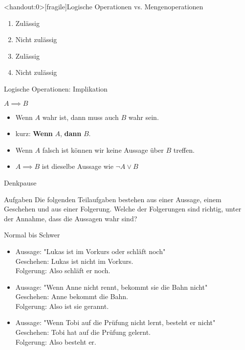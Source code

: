 {
	\begin{frame}<handout:0>[fragile]{Logische Operationen vs. Mengenoperationen}
		\begin{enumerate}[<+- | alert@+>]
			\item Zulässig
			\item Nicht zulässig
			\item Zulässig
			\item Nicht zulässig
		\end{enumerate}
	\end{frame}
}



\begin{frame}{Logische Operationen: Implikation}
\begin{alertblock}{$A\implies B$}
\begin{itemize}
    \item \glqq Wenn $A$ wahr ist, dann muss auch $B$ wahr sein.\grqq
    \item kurz: \glqq\textbf{Wenn} $A$, \textbf{dann} $B$.\grqq
    \item Wenn $A$ falsch ist können wir keine Aussage über $B$ treffen.
    \item $A\implies B$ ist dieselbe Aussage wie $\neg A \vee B$
\end{itemize}
\end{alertblock}
\end{frame}

{
	\begin{frame}{Denkpause}
		\begin{alertblock}{Aufgaben}
			Die folgenden Teilaufgaben bestehen aus einer Aussage, einem Geschehen und aus einer Folgerung. Welche der Folgerungen sind richtig, unter der Annahme, 
			dass die Aussagen wahr sind?
		\end{alertblock}
		\begin{block}{Normal bis Schwer}
			\begin{itemize}
				\item Aussage: "Lukas ist im Vorkurs oder schläft noch"\\
				Geschehen: Lukas ist nicht im Vorkurs.\\
				Folgerung: Also schläft er noch.
				\item Aussage: "Wenn Anne nicht rennt, bekommt sie die Bahn nicht"\\
				Geschehen: Anne bekommt die Bahn.\\
				Folgerung: Also ist sie gerannt.
				\item Aussage: "Wenn Tobi auf die Prüfung nicht lernt, besteht er nicht"\\
				Geschehen: Tobi hat auf die Prüfung gelernt.\\
				Folgerung: Also besteht er.
			\end{itemize}
		\end{block}
	\end{frame}
}
	
